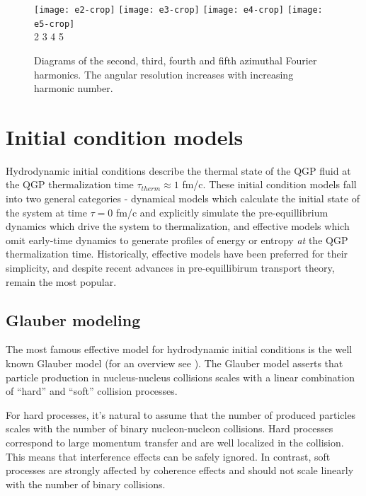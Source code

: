 \documentclass[aps,prc,reprint,amsmath,nofootinbib]{revtex4-1}
\begin{document}
\begin{figure}[t]
 \texttt{[image: e2-crop]} \hspace{.01\columnwidth} 
 \texttt{[image: e3-crop]} \hspace{.01\columnwidth}
 \texttt{[image: e4-crop]} \hspace{.01\columnwidth}
 \texttt{[image: e5-crop]}\\
 \flushleft
 \vspace{-0.1in}
 \hspace{0.08\columnwidth} 2 \hspace{0.19\columnwidth} 3 \hspace{0.21\columnwidth} 4 \hspace{0.22\columnwidth} 5
 \caption{\label{fig:harmonics} Diagrams of the second, third, fourth and fifth azimuthal Fourier harmonics. The angular resolution increases with increasing harmonic number.}
\end{figure}

\section{Initial condition models}
\label{sec:initial_condition_models}

Hydrodynamic initial conditions describe the thermal state of the QGP fluid at the QGP thermalization time $\tau_{therm} \approx 1$ fm/c. These initial condition models
fall into two general categories - dynamical models which calculate the initial state of the system at time $\tau=0$ fm/c and explicitly simulate the pre-equillibrium 
dynamics which drive the system to thermalization, and effective models which omit early-time dynamics to generate profiles of energy or entropy \emph{at} the QGP thermalization time. 
Historically, effective models have been preferred for their simplicity, and despite recent advances in pre-equillibirum transport theory, remain the most popular.

\subsection{Glauber modeling}

The most famous effective model for hydrodynamic initial conditions is the well known Glauber model (for an overview see \cite{glauber}). The Glauber model asserts that particle production in nucleus-nucleus 
collisions scales with a linear combination of ``hard'' and ``soft'' collision processes. 

For hard processes, it's natural to assume that the number of produced particles scales with the number of binary nucleon-nucleon collisions. Hard processes correspond
to large momentum transfer and are well localized in the collision. This means that interference effects can be safely ignored. In contrast, soft processes are strongly 
affected by coherence effects and should not scale linearly with the number of binary collisions.
\end{document}
